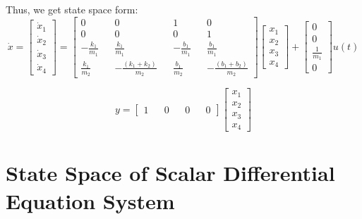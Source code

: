 \documentclass[12pt,a4paper]{article}
\begin{document}
	Thus, we get state space form:
	\[
	\dot{x} = 
	\begin{bmatrix}
		\dot{x}_1 \\
		\dot{x}_2 \\
		\dot{x}_3 \\
		\dot{x}_4 
	\end{bmatrix} =
	\begin{bmatrix}
		0                 &   & 0                       &   & 1                 &   & 0                       \\
		0                 &   & 0                       &   & 0                 &   & 1                       \\
		- \frac{k_1}{m_1} &   & \frac{k_1}{m_1}         &   & - \frac{b_1}{m_1} &   & \frac{b_1}{m_1}         \\
		\frac{k_1}{m_2}   &   & - \frac{(k_1+k_2)}{m_2} &   & \frac{b_1}{m_2}   &   & - \frac{(b_1+b_2)}{m_2} 
	\end{bmatrix}
	\begin{bmatrix}
		x_1 \\
		x_2 \\
		x_3 \\
		x_4 
	\end{bmatrix} +
	\begin{bmatrix}
		0             \\
		0             \\
		\frac{1}{m_1} \\
		0             
	\end{bmatrix} u(t)
	\]
	
	\[
	y =
	\begin{bmatrix}
		1 &   & 0 &   & 0 &   & 0 
	\end{bmatrix}
	\begin{bmatrix}
		x_1 \\
		x_2 \\
		x_3 \\
		x_4 
	\end{bmatrix}
	\]
	
	
	
	
	\section{State Space of Scalar Differential Equation System}
	
\end{document}
